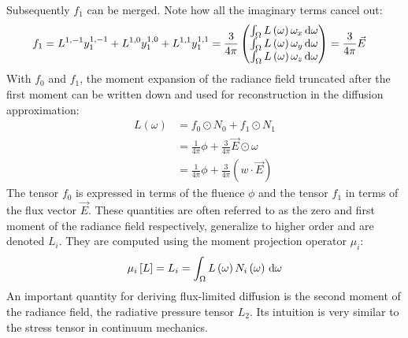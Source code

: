 Subsequently $f_1$ can be merged. Note how all the imaginary terms cancel out:
\begin{align}
f_1 &= 
L^{1,-1}y^{1,-1}_1+L^{1,0}y^{1,0}_1+L^{1,1}y^{1,1}_1
=
\frac{3}{4\pi}
\begin{pmatrix}
\int_\Omega{L\left(\omega\right)\omega_x\,\mathrm{d}\omega}
\\
\int_\Omega{L\left(\omega\right)\omega_y\,\mathrm{d}\omega}
\\
\int_\Omega{L\left(\omega\right)\omega_z\,\mathrm{d}\omega}
\end{pmatrix}
=
\frac{3}{4\pi}\vec{E}
\end{align}
With $f_0$ and $f_1$, the moment expansion of the radiance field truncated after the first moment can be written down and used for reconstruction in the diffusion approximation:
\begin{align}
\nonumber
L\left(\omega\right) &= 
f_0\odot N_0 + f_1\odot N_1
\\
\nonumber
&=
\frac{1}{4\pi}\phi + \frac{3}{4\pi}\vec{E} \odot \omega
\\
\label{eq:moment_expansion_L}
&=
\frac{1}{4\pi}\phi + \frac{3}{4\pi}\left(w \cdot \vec{E}\right)
\end{align}
The tensor $f_0$ is expressed in terms of the fluence $\phi$ and the tensor $f_1$ in terms of the flux vector $\vec{E}$. These quantities are often referred to as the zero and first moment of the radiance field respectively, generalize to higher order and are denoted $L_i$. They are computed using the moment projection operator $\mu_i$:
\begin{align}
\label{eq:moment_expansion_mu}
\mu_i\left[L\right] = L_i = \int_\Omega{L\left(\omega\right)N_i\left(\omega\right)\,\mathrm{d}\omega}
\end{align}
An important quantity for deriving flux-limited diffusion is the second moment of the radiance field, the radiative pressure tensor $L_2$. Its intuition is very similar to the stress tensor in continuum mechanics.


